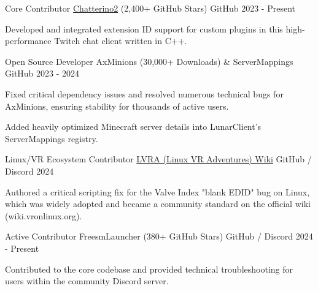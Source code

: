 \documentclass[11pt, a4paper]{awesome-cv}
\begin{document}
\begin{cventries}

  \cventry
    {Core Contributor}
    {\href{https://github.com/Chatterino/chatterino2}{Chatterino2} (2,400+ GitHub Stars)}
    {GitHub}
    {2023 - Present}
    {
      \begin{cvitems}
        \item {Developed and integrated extension ID support for custom plugins in this high-performance Twitch chat client written in C++.}
      \end{cvitems}
    }

  \cventry
    {Open Source Developer}
    {AxMinions (30,000+ Downloads) \& ServerMappings}
    {GitHub}
    {2023 - 2024}
    {
      \begin{cvitems}
        \item {Fixed critical dependency issues and resolved numerous technical bugs for AxMinions, ensuring stability for thousands of active users.}
        \item {Added heavily optimized Minecraft server details into LunarClient's ServerMappings registry.}
      \end{cvitems}
    }

  \cventry
    {Linux/VR Ecosystem Contributor}
    {\href{https://wiki.vronlinux.org/}{LVRA (Linux VR Adventures) Wiki}}
    {GitHub / Discord}
    {2024}
    {
      \begin{cvitems}
        \item {Authored a critical scripting fix for the Valve Index "blank EDID" bug on Linux, which was widely adopted and became a community standard on the official wiki (wiki.vronlinux.org).}
      \end{cvitems}
    }
  
  \cventry
    {Active Contributor}
    {FreesmLauncher (380+ GitHub Stars)}
    {GitHub / Discord}
    {2024 - Present}
    {
      \begin{cvitems}
        \item {Contributed to the core codebase and provided technical troubleshooting for users within the community Discord server.}
      \end{cvitems}
    }

\end{cventries}
\end{document}
